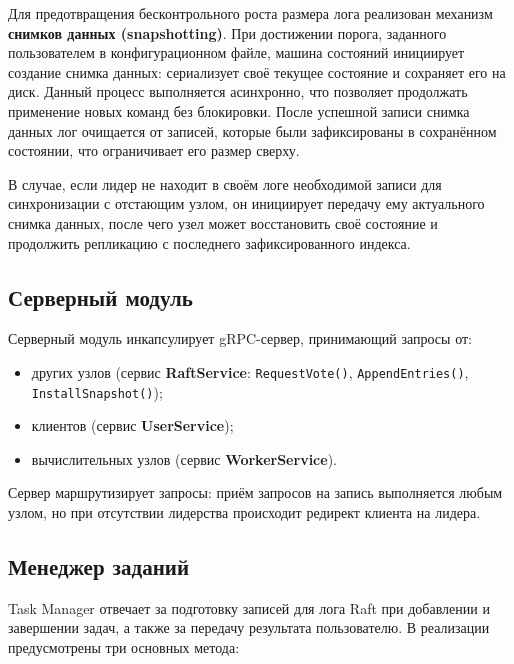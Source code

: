Для предотвращения бесконтрольного роста размера лога реализован механизм
\textbf{снимков данных (snapshotting)}. При достижении порога, заданного
пользователем в конфигурационном файле, машина состояний инициирует создание
снимка данных: сериализует своё текущее состояние и сохраняет его на диск. Данный
процесс выполняется асинхронно, что позволяет продолжать применение новых
команд без блокировки. После успешной записи снимка данных лог очищается от записей,
которые были зафиксированы в сохранённом состоянии, что ограничивает его размер
сверху.

В случае, если лидер не находит в своём логе необходимой записи для
синхронизации с отстающим узлом, он инициирует передачу ему актуального
снимка данных, после чего узел может восстановить своё состояние и продолжить
репликацию с последнего зафиксированного индекса.

\subsection{Серверный модуль}

Серверный модуль инкапсулирует gRPC-сервер, принимающий запросы от:
\begin{itemize}
    \item других узлов (сервис \textbf{RaftService}: \texttt{RequestVote()},
    \texttt{AppendEntries()}, \texttt{InstallSnapshot()});
    \item клиентов (сервис \textbf{UserService});
    \item вычислительных узлов (сервис \textbf{WorkerService}).
\end{itemize}

Сервер маршрутизирует запросы: приём запросов на запись выполняется любым
узлом, но при отсутствии лидерства происходит редирект клиента на лидера.

\subsection{Менеджер заданий}

Task Manager отвечает за подготовку записей для лога Raft при добавлении и
завершении задач, а также за передачу результата пользователю. В реализации
предусмотрены три основных метода:

